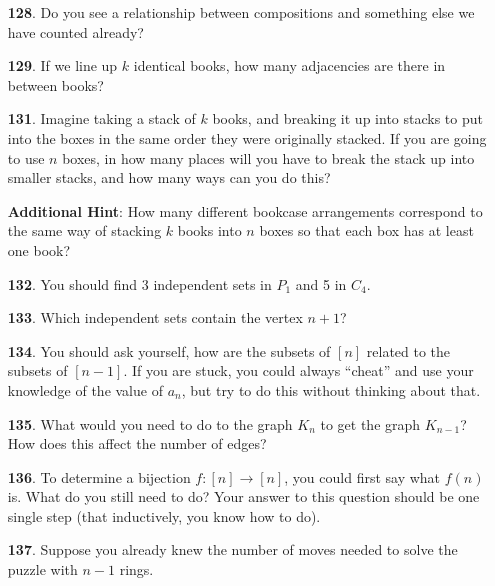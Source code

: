 \documentclass[10pt,]{book}
\theoremstyle{plain}
\theoremstyle{definition}
\theoremstyle{definition}
\theoremstyle{definition}
\numberwithin{equation}{chapter}
\begin{document}
\begin{itemize}[itemsep=1em]
\item[\textbf{128}.]\hypertarget{p-863}{}%
Do you see a relationship between compositions and something else we have counted already?%

\item[\textbf{129}.]\hypertarget{p-866}{}%
If we line up \(k\) identical books, how many adjacencies are there in between books?%

\item[\textbf{131}.]\hypertarget{p-873}{}%
Imagine taking a stack of \(k\) books, and breaking it up into stacks to put into the boxes in the same order they were originally stacked. If you are going to use \(n\) boxes, in how many places will you have to break the stack up into smaller stacks, and how many ways can you do this?%

\par\smallskip
\noindent\textbf{Additional Hint}: \hypertarget{p-874}{}%
How many different bookcase arrangements correspond to the same way of stacking \(k\) books into \(n\) boxes so that each box has at least one book?%

\item[\textbf{132}.]\hypertarget{p-885}{}%
You should find 3 independent sets in \(P_1\) and 5 in \(C_4\).%

\item[\textbf{133}.]\hypertarget{p-889}{}%
Which independent sets contain the vertex \(n+1\)?%

\item[\textbf{134}.]\hypertarget{p-893}{}%
You should ask yourself, how are the subsets of \([n]\) related to the subsets of \([n-1]\).  If you are stuck, you could always ``cheat'' and use your knowledge of the value of \(a_n\), but try to do this without thinking about that.%

\item[\textbf{135}.]\hypertarget{p-895}{}%
What would you need to do to the graph \(K_n\) to get the graph \(K_{n-1}\)?  How does this affect the number of edges?%

\item[\textbf{136}.]\hypertarget{p-897}{}%
To determine a bijection \(f:[n] \to [n]\), you could first say what \(f(n)\) is.  What do you still need to do?  Your answer to this question should be one single step (that inductively, you know how to do).%

\item[\textbf{137}.]\hypertarget{p-899}{}%
Suppose you already knew the number of moves needed to solve the puzzle with \(n-1\) rings.%


\end{itemize}
\end{document}
